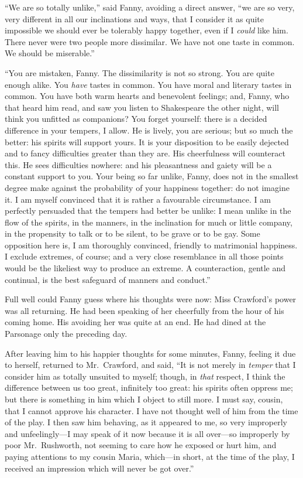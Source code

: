 ``We are so totally unlike,'' said Fanny, avoiding a
direct answer, ``we are so very, very different in all
our inclinations and ways, that I consider it as quite
impossible we should ever be tolerably happy together,
even if I \emph{could} like him.  There never were two people
more dissimilar.  We have not one taste in common.
We should be miserable.''

``You are mistaken, Fanny.  The dissimilarity is not so strong.
You are quite enough alike.  You \emph{have} tastes in common.
You have moral and literary tastes in common.  You have
both warm hearts and benevolent feelings; and, Fanny,
who that heard him read, and saw you listen to Shakespeare
the other night, will think you unfitted as companions?
You forget yourself:  there is a decided difference
in your tempers, I allow.  He is lively, you are serious;
but so much the better:  his spirits will support yours.
It is your disposition to be easily dejected and to fancy
difficulties greater than they are.  His cheerfulness
will counteract this.  He sees difficulties nowhere:
and his pleasantness and gaiety will be a constant support
to you.  Your being so far unlike, Fanny, does not in
the smallest degree make against the probability of your
happiness together:  do not imagine it.  I am myself
convinced that it is rather a favourable circumstance.
I am perfectly persuaded that the tempers had better be unlike:
I mean unlike in the flow of the spirits, in the manners,
in the inclination for much or little company, in the
propensity to talk or to be silent, to be grave or to be gay.
Some opposition here is, I am thoroughly convinced,
friendly to matrimonial happiness.  I exclude extremes,
of course; and a very close resemblance in all those
points would be the likeliest way to produce an extreme.
A counteraction, gentle and continual, is the best safeguard
of manners and conduct.''

Full well could Fanny guess where his thoughts were now:
Miss Crawford's power was all returning.  He had been
speaking of her cheerfully from the hour of his coming home.
His avoiding her was quite at an end.  He had dined at the
Parsonage only the preceding day.

After leaving him to his happier thoughts for some minutes,
Fanny, feeling it due to herself, returned to Mr.\ Crawford,
and said, ``It is not merely in \emph{temper} that I consider
him as totally unsuited to myself; though, in \emph{that}
respect, I think the difference between us too great,
infinitely too great:  his spirits often oppress me;
but there is something in him which I object to still more.
I must say, cousin, that I cannot approve his character.
I have not thought well of him from the time of the play.
I then saw him behaving, as it appeared to me, so very
improperly and unfeelingly---I may speak of it now because
it is all over---so improperly by poor Mr.\ Rushworth,
not seeming to care how he exposed or hurt him,
and paying attentions to my cousin Maria, which---in short,
at the time of the play, I received an impression which
will never be got over.''

